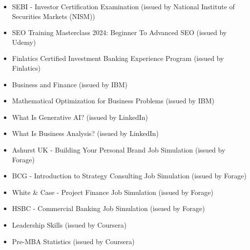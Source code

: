 \documentclass[a4paper,10pt]{article}
\newcommand{\isep}{-2 pt}
\begin{document}
\begin{itemize} \itemsep \isep

    \item SEBI - Investor Certification Examination (issued by National Institute of Securities Markets (NISM))

    \item SEO Training Masterclass 2024: Beginner To Advanced SEO (issued by Udemy)

    \item Finlatics Certified Investment Banking Experience Program (issued by Finlatics)

    \item Business and Finance (issued by IBM)

    \item Mathematical Optimization for Business Problems (issued by IBM)

    \item What Is Generative AI? (issued by LinkedIn)

    \item What Is Business Analysis? (issued by LinkedIn)

    \item Ashurst UK - Building Your Personal Brand Job Simulation (issued by Forage)

    \item BCG - Introduction to Strategy Consulting Job Simulation (issued by Forage)

    \item White \& Case - Project Finance Job Simulation (issued by Forage)

    \item HSBC - Commercial Banking Job Simulation (issued by Forage)

    \item Leadership Skills (issued by Coursera)

    \item Pre-MBA Statistics (issued by Coursera)

\end{itemize}
\end{document}
